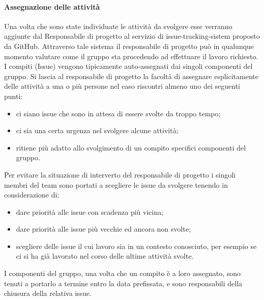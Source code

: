 \paragraph{Assegnazione delle attività}
Una volta che sono state individuate le attività da svolgere esse verranno aggiunte dal Responsabile di progetto al servizio di issue-tracking-sistem proposto da GitHub.
Attraverso tale sistema il responsabile di progetto può in qualunque momento valutare come il gruppo sta procedendo ad effettuare il lavoro richiesto.\\
I compiti (Issue) vengono tipicamente auto-assegnati dai singoli componenti del gruppo. Si lascia al responsabile di progetto la facoltà di assegnare esplicitamente delle attività a una o più persone nel caso riscontri almeno uno dei seguenti punti:
\begin{itemize}
    \item ci siano issue che sono in attesa di essere svolte da troppo tempo;
    \item ci sia una certa urgenza nel svolgere alcune attività;
    \item ritiene più adatto allo svolgimento di un compito specifici componenti del gruppo.
\end{itemize}
Per evitare la situazione di interverto del responsabile di progetto i singoli membri del team sono portati a scegliere le issue da svolgere tenendo in considerazione di:
\begin{itemize}
    \item dare priorità alle issue con scadenza più vicina;
    \item dare priorità alle issue più vecchie ed ancora non svolte;
    \item scegliere delle issue il cui lavoro sia in un contesto conosciuto, per esempio se ci si ha già lavorato nel corso delle ultime attività svolte.
\end{itemize}
I componenti del gruppo, una volta che un compito è a loro assegnato, sono tenuti a portarlo a termine entro la data prefissata, e sono responsabili della chiusura della relativa issue.

